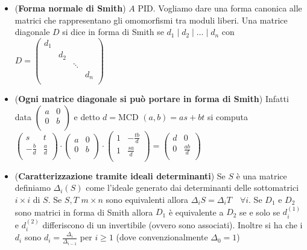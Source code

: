 \documentclass[a4paper,NoNotes,GeneralMath]{stdmdoc}
\newcommand{\MCD}{\text{MCD }}
\begin{document}
\begin{itemize}
		\item ({\bf Forma normale di Smith}) $A$ PID. Vogliamo dare una forma canonica alle matrici che rappresentano gli omomorfismi tra moduli liberi. Una matrice diagonale $D$ si dice in forma di Smith se $d_1 \mid d_2 \mid \ldots \mid d_n$ con $D = \left( \begin{array}{cccc} d_1 & & & \\ & d_2 & & \\ & & \ddots & \\ & & & d_n \\ \end{array} \right)$
		\item ({\bf Ogni matrice diagonale si può portare in forma di Smith}) Infatti data $\left( \begin{array}{cc} a & 0 \\ 0 & b \\ \end{array} \right)$ e detto $d = \MCD(a, b) = as + bt$ si computa $\left( \begin{array}{cc} s & t \\ -\frac{b}{d} & \frac{a}{d} \\ \end{array} \right) \cdot \left( \begin{array}{cc} a & 0 \\ 0 & b \\ \end{array} \right) \cdot \left( \begin{array}{cc} 1 & - \frac{tb}{d} \\ 1 & \frac{sa}{d} \\ \end{array} \right) = \left( \begin{array}{cc} d & 0 \\ 0 & \frac{ab}{d} \\ \end{array} \right)$
		\item ({\bf Caratterizzazione tramite ideali determinanti}) Se $S$ è una matrice definiamo $\Delta_i(S)$ come l'ideale generato dai determinanti delle sottomatrici $i \times i$ di $S$. Se $S, T$ $m \times n$ sono equivalenti allora $\Delta_i S = \Delta_i T \quad \forall i$. Se $D_1$ e $D_2$ sono matrici in forma di Smith allora $D_1$ è equivalente a $D_2$ se e solo se $d_i^{(1)}$ e $d_i^{(2)}$ differiscono di un invertibile (ovvero sono associati). Inoltre si ha che i $d_i$ sono $d_i = \frac{\Delta_{i}}{\Delta_{i-1}}$ per $i \ge 1$ (dove convenzionalmente $\Delta_0 = 1$)

\end{itemize}
\end{document}
